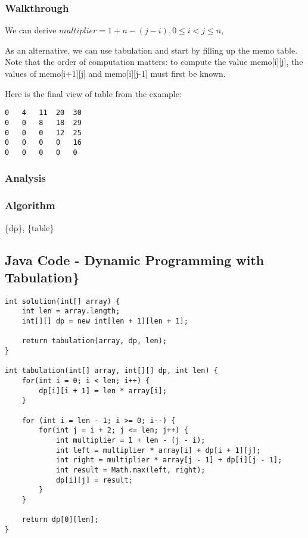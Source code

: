 \documentclass[]{book}
\begin{document}
\hypertarget{walkthrough-38}{%
\subsubsection{Walkthrough}\label{walkthrough-38}}

We can derive \(multiplier = 1 + n - (j - i), 0 \le i < j \le n,\)

As an alternative, we can use tabulation and start by filling up the memo table. Note that the order of computation
matters: to compute the value memo{[}i{]}{[}j{]}, the values of memo{[}i+1{]}{[}j{]} and memo{[}i{]}{[}j-1{]} must first be known.

Here is the final view of table from the example:

\begin{verbatim}
0   4   11  20  30
0   0   8   18  29
0   0   0   12  25
0   0   0   0   16
0   0   0   0   0
\end{verbatim}

\hypertarget{analysis-41}{%
\subsubsection{Analysis}\label{analysis-41}}

\hypertarget{algorithm-41}{%
\subsubsection{Algorithm}\label{algorithm-41}}

\{dp\}, \{table\}

\hypertarget{java-code---dynamic-programming-with-tabulation}{%
\subsection{Java Code - Dynamic Programming with Tabulation\}}\label{java-code---dynamic-programming-with-tabulation}}

\begin{verbatim}
int solution(int[] array) {
    int len = array.length;
    int[][] dp = new int[len + 1][len + 1];

    return tabulation(array, dp, len);
}

int tabulation(int[] array, int[][] dp, int len) {
    for(int i = 0; i < len; i++) {
        dp[i][i + 1] = len * array[i];
    }

    for (int i = len - 1; i >= 0; i--) {
        for(int j = i + 2; j <= len; j++) {
            int multiplier = 1 + len - (j - i);
            int left = multiplier * array[i] + dp[i + 1][j];
            int right = multiplier * array[j - 1] + dp[i][j - 1];
            int result = Math.max(left, right);
            dp[i][j] = result;
        }
    }

    return dp[0][len];
}
\end{verbatim}
\end{document}
